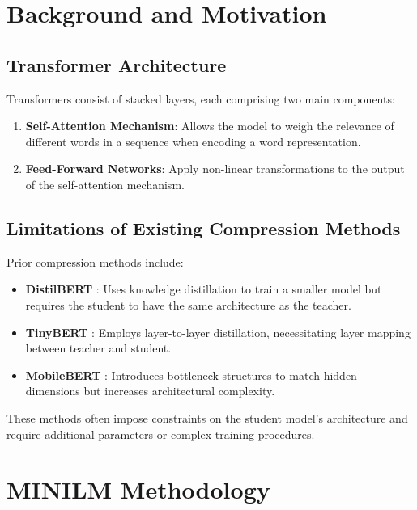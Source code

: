 \documentclass{article}
\begin{document}
\section{Background and Motivation}  
  
\subsection{Transformer Architecture}  
  
Transformers consist of stacked layers, each comprising two main components:  
  
\begin{enumerate}  
    \item \textbf{Self-Attention Mechanism}: Allows the model to weigh the relevance of different words in a sequence when encoding a word representation.  
    \item \textbf{Feed-Forward Networks}: Apply non-linear transformations to the output of the self-attention mechanism.  
\end{enumerate}  
  
\subsection{Limitations of Existing Compression Methods}  
  
Prior compression methods include:  
  
\begin{itemize}  
    \item \textbf{DistilBERT} \cite{sanh2019distilbert}: Uses knowledge distillation to train a smaller model but requires the student to have the same architecture as the teacher.  
    \item \textbf{TinyBERT} \cite{jiao2019tinybert}: Employs layer-to-layer distillation, necessitating layer mapping between teacher and student.  
    \item \textbf{MobileBERT} \cite{sun2020mobilebert}: Introduces bottleneck structures to match hidden dimensions but increases architectural complexity.  
\end{itemize}  
  
These methods often impose constraints on the student model's architecture and require additional parameters or complex training procedures.  
  
\section{MINILM Methodology}  
  
\end{document}
